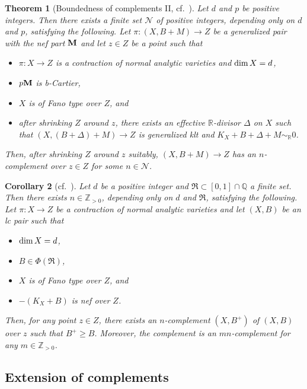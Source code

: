 \documentclass[12pt]{amsart}
\newtheorem{thm}{Theorem}[section]
\newtheorem{cor}[thm]{Corollary}
\theoremstyle{definition}
\begin{document}
\begin{thm}[Boundedness of complements I\!I, cf.~{\cite[Theorem 1.1]{chhx-compl}}]\label{thm--generalized-compl-main-2}
Let $d$ and $p$ be positive integers. 
Then there exists a finite set $\mathcal{N}$ of positive integers, depending only on $d$ and $p$, satisfying the following.
Let $\pi \colon(X,B+M) \to Z$ be a generalized pair with the nef part $\boldsymbol{\rm M}$ and let $z \in Z$ be a point such that 
\begin{itemize}
\item
$\pi \colon X \to Z$ is a contraction of normal analytic varieties and ${\rm dim}\,X=d$, 
\item
$p \boldsymbol{\rm M}$ is b-Cartier, 
\item
$X$ is of Fano type over $Z$, and 
\item
after shrinking $Z$ around $z$, there exists an effective $\mathbb{R}$-divisor $\Delta$ on $X$ such that $(X,(B+\Delta)+M) \to Z$ is generalized klt and $K_{X}+B+\Delta+M \sim_{\mathbb{R}} 0$.
\end{itemize} 
Then, after shrinking $Z$ around $z$ suitably, $(X,B+M) \to Z$ has an $n$-complement over $z \in Z$ for some $n \in \mathcal{N}$. 
\end{thm}

\begin{cor}[cf.~{\cite[Theorem 1.8]{birkar-compl}}]\label{cor--compl-log-pair}
Let $d$ be a positive integer and $\mathfrak{R} \subset [0,1] \cap \mathbb{Q}$ a finite set. 
Then there exists $n \in \mathbb{Z}_{>0}$, depending only on $d$ and $\mathfrak{R}$, satisfying the following. 
Let $\pi \colon X \to Z$ be a contraction of normal analytic varieties and let $(X,B)$ be an lc pair such that 
\begin{itemize}
\item
${\rm dim}\,X=d$, 
\item
$B \in \Phi(\mathfrak{R})$, 
\item
$X$ is of Fano type over $Z$, and 
\item
$-(K_{X}+B)$ is nef over $Z$.
\end{itemize} 
Then, for any point $z \in Z$, there exists an $n$-complement $(X,B^{+})$ of $(X,B)$ over $z$ such that $B^{+} \geq B$. 
Moreover, the complement is an $mn$-complement for any $m \in \mathbb{Z}_{>0}$. 
\end{cor}


\subsection{Extension of complements}\label{subsec--extend-comple}
\end{document}

